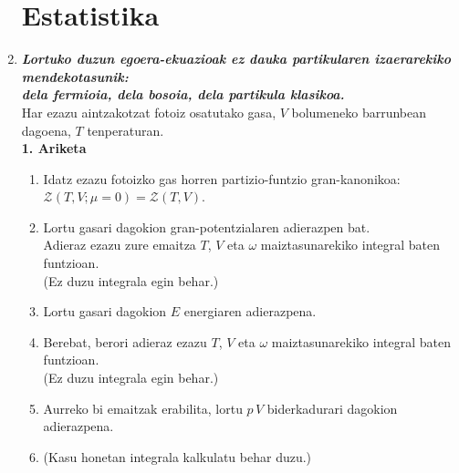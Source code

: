 \documentclass[10pt]{article}              %
\begin{document}
\begin{enumerate}
\section*{Estatistika}




\item[] \textit{\textbf{Lortuko duzun egoera-ekuazioak ez dauka partikularen izaerarekiko mendekotasunik:\\dela fermioia, dela bosoia, dela partikula klasikoa.}} \\

Har ezazu aintzakotzat fotoiz osatutako gasa, $V$ bolumeneko barrunbean dagoena, $T$ tenperaturan.\\

\textbf{1. Ariketa}

\begin{enumerate} 
\item Idatz ezazu fotoizko gas horren partizio-funtzio gran-kanonikoa: $\mathscr{Z}(T,V;\mu=0)=\mathscr{Z}(T,V)$.
\item Lortu gasari dagokion gran-potentzialaren adierazpen bat.\\
      Adieraz ezazu zure emaitza $T$, $V$ eta $\omega$ maiztasunarekiko integral baten funtzioan.\\
      (Ez duzu integrala egin behar.)
\item Lortu gasari dagokion $E$ energiaren adierazpena.
\item[] Berebat, berori adieraz ezazu $T$, $V$ eta $\omega$ maiztasunarekiko integral baten funtzioan.\\
      (Ez duzu integrala egin behar.)
\item Aurreko bi emaitzak erabilita, lortu $p\,V$ biderkadurari dagokion adierazpena.
\item[] (Kasu honetan integrala kalkulatu behar duzu.)
\end{enumerate} 

\end{enumerate}
\end{document}

